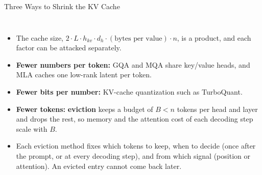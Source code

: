 \begin{frame}{Three Ways to Shrink the KV Cache}
  \begin{columns}[T,onlytextwidth]
      \begin{itemize}\footnotesize\itemsep0.35em
        \item[\textcolor{red}{$\blacktriangleright$}] The cache size, $2 \cdot L \cdot h_{kv} \cdot d_h \cdot (\text{bytes per value}) \cdot n$, is a product, and each factor can be attacked separately.
        \item[\textcolor{red}{$\blacktriangleright$}] \textbf{Fewer numbers per token:} GQA and MQA share key/value heads, and MLA caches one low-rank latent per token.
        \item[\textcolor{red}{$\blacktriangleright$}] \textbf{Fewer bits per number:} KV-cache quantization such as TurboQuant.
        \item[\textcolor{red}{$\blacktriangleright$}] \textbf{Fewer tokens:} \textbf{eviction} keeps a budget of $B < n$ tokens per head and layer and drops the rest, so memory and the attention cost of each decoding step scale with $B$.
        \item[\textcolor{red}{$\blacktriangleright$}] Each eviction method fixes which tokens to keep, when to decide (once after the prompt, or at every decoding step), and from which signal (position or attention). An evicted entry cannot come back later.
      \end{itemize}
      \centering
      \vspace{1.2em}
\end{columns}
\end{frame}
